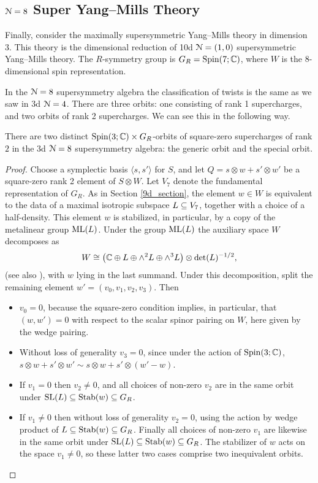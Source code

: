 \documentclass[10pt, oneside]{article}
\begin{document}
\subsection{\texorpdfstring{$\mathcal N = 8$}{N=8} Super Yang--Mills Theory} \label{3d8section}
Finally, consider the maximally supersymmetric Yang--Mills theory in dimension 3.
This theory is the dimensional reduction of 10d $\mathcal N = (1,0)$ supersymmetric Yang--Mills theory.  
The $R$-symmetry group is $G_R = \mathrm{Spin}(7;\mathbb C)$, where $W$ is the $8$-dimensional spin representation.

In the $\mathcal{N}=8$ supersymmetry algebra the classification of twists is the same as we saw in 3d $\mathcal{N}=4$.  
There are three orbits: one consisting of rank 1 supercharges, and two orbits of rank 2 supercharges.  We can see this in the following way.
\begin{lemma}
There are two distinct $\mathrm{Spin}(3;\mathbb C) \times G_R$-orbits of square-zero supercharges of rank $2$ in the 3d $\mathcal{N}=8$ supersymmetry algebra: the generic orbit and the special orbit.
\label{lm:3dN8twoorbits}
\end{lemma}

\begin{proof}
Choose a symplectic basis $\langle s, s' \rangle$ for $S$, and let $Q = s \otimes w + s' \otimes w'$ be a square-zero rank 2 element of $S \otimes W$.  Let $V_7$ denote the fundamental representation of $G_R$.  As in Section \ref{9d_section}, the element $w \in W$ is equivalent to the data of a maximal isotropic subspace $L \subseteq V_7$, together with a choice of a half-density.  This element $w$ is stabilized, in particular, by a copy of the metalinear group $\mathrm{ML}(L)$.
Under the group $\mathrm{ML}(L)$ the auxiliary space $W$ decomposes as
\[W \cong \left(\mathbb C \oplus L \oplus \wedge^2 L \oplus \wedge^3 L \right) \otimes \det(L)^{-1/2},\]
(see also \cite[Section 4.7]{ElliottSafronov}), with $w$ lying in the last summand.  Under this decomposition, split the remaining element $w' = (v_0, v_1, v_2, v_3)$.  Then
\begin{itemize}
 \item $v_0 = 0$, because the square-zero condition implies, in particular, that $(w,w') = 0$ with respect to the scalar spinor pairing on $W$, here given by the wedge pairing.
 \item Without loss of generality $v_3 = 0$, since under the action of $\mathrm{Spin}(3;\mathbb C)$, $s \otimes w + s' \otimes w' \sim s \otimes w + s' \otimes (w'-w)$.
 \item If $v_1 = 0$ then $v_2 \ne 0$, and all choices of non-zero $v_2$ are in the same orbit under $\mathrm{SL}(L) \subseteq \operatorname{Stab}(w) \subseteq G_R$.
 \item If $v_1 \ne 0$ then without loss of generality $v_2 = 0$, using the action by wedge product of $L \subseteq \operatorname{Stab}(w) \subseteq G_R$.  Finally all choices of non-zero $v_1$ are likewise in the same orbit under $\mathrm{SL}(L) \subseteq \operatorname{Stab}(w) \subseteq G_R$.  The stabilizer of $w$ acts on the space $v_1 \ne 0$, so these latter two cases comprise two inequivalent orbits.
\end{itemize}
\end{proof}
\end{document}
